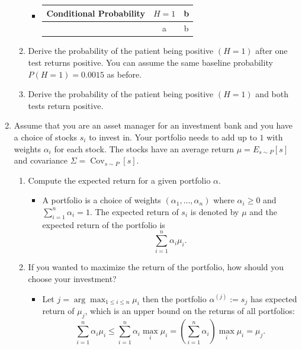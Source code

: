 \documentclass{article}
\begin{document}
\begin{enumerate}
\begin{enumerate}
			\begin{itemize}
				\item
					\begin{center}
						\begin{tabular}{|c|c|c|} \hline
						Conditional Probability & $H = 1$ & b \\ \hline
						& a & b \\ \hline
						\end{tabular}
					\end{center}
			\end{itemize}
		\item Derive the probability of the patient being positive $(H = 1)$ after one test returns positive. You can assume the same baseline probability $P(H = 1) = 0.0015$ as before.
		\item Derive the probability of the patient being positive $(H = 1)$ and both tests return positive.
	\end{enumerate}
	\item Assume that you are an asset manager for an investment bank and you have a choice of stocks $s_i$ to invest in. Your portfolio needs to add up to $1$ with weights $\alpha_i$ for each stock. The stocks have an average return $\mu = E_{s \sim P}[s]$ and covariance $\Sigma = \operatorname{Cov}_{s \sim P}[s]$.
		\begin{enumerate}
			\item Compute the expected return for a given portfolio $\alpha$.
				\begin{itemize}
					\item A portfolio is a choice of weights $(\alpha_1, \dots, \alpha_n)$ where $\alpha_i \geq 0$ and $\sum_{i = 1}^n \alpha_i = 1$. The expected return of $s_i$ is denoted by $\mu$ and the expected return of the portfolio is
					$$
					\sum_{i = 1}^n \alpha_i \mu_i.
					$$
				\end{itemize}
			\item If you wanted to maximize the return of the portfolio, how should you choose your investment?
				\begin{itemize}
					\item Let $j = \operatorname{arg} \max_{1 \leq i \leq n} \mu_i$ then the portfolio $\alpha^{(j)} := s_j$ has expected return of $\mu_j$, which is an upper bound on the returns of all portfolios:
					$$
					\sum_{i = 1}^n \alpha_i \mu_i \leq \sum_{i = 1}^n \alpha_i \max_i \mu_i = \left(\sum_{i = 1}^n \alpha_i\right) \max_i \mu_i = \mu_j.
					$$
				\end{itemize}

\end{enumerate}
\end{enumerate}
\end{document}
